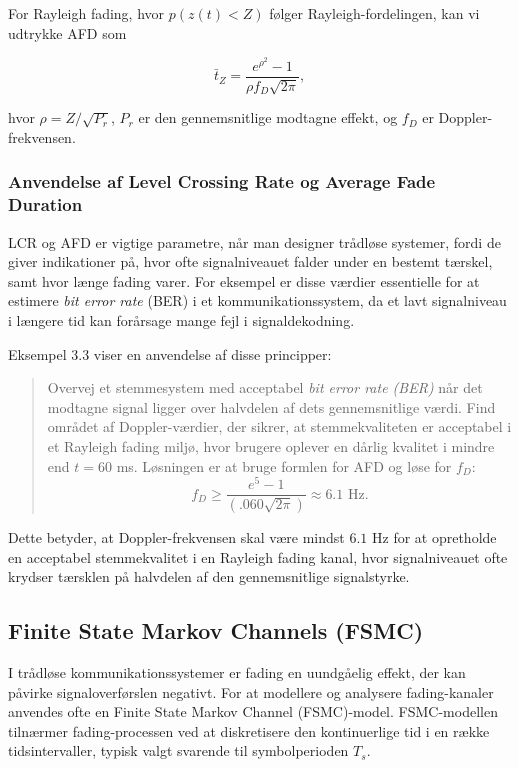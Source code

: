 \documentclass[a4paper,12pt]{book}
\begin{document}
	For Rayleigh fading, hvor $p(z(t) < Z)$ følger Rayleigh-fordelingen, kan vi udtrykke AFD som
	
	\[
	\bar{t}_Z = \frac{e^{\rho^2} - 1}{\rho f_D \sqrt{2\pi}},
	\]
	
	hvor $\rho = Z/\sqrt{P_r}$, $P_r$ er den gennemsnitlige modtagne effekt, og $f_D$ er Doppler-frekvensen.
	
	\subsubsection{Anvendelse af Level Crossing Rate og Average Fade Duration}
	LCR og AFD er vigtige parametre, når man designer trådløse systemer, fordi de giver indikationer på, hvor ofte signalniveauet falder under en bestemt tærskel, samt hvor længe fading varer. For eksempel er disse værdier essentielle for at estimere \textit{bit error rate} (BER) i et kommunikationssystem, da et lavt signalniveau i længere tid kan forårsage mange fejl i signaldekodning.
	
	Eksempel 3.3 viser en anvendelse af disse principper:
	\begin{quote}
		Overvej et stemmesystem med acceptabel \textit{bit error rate (BER)} når det modtagne signal ligger over halvdelen af dets gennemsnitlige værdi. Find området af Doppler-værdier, der sikrer, at stemmekvaliteten er acceptabel i et Rayleigh fading miljø, hvor brugere oplever en dårlig kvalitet i mindre end $t = 60$ ms. Løsningen er at bruge formlen for AFD og løse for $f_D$:
		\[
		f_D \geq \frac{e^{5} - 1}{(.060\sqrt{2\pi})} \approx 6.1 \text{ Hz}.
		\]
	\end{quote}
	
	Dette betyder, at Doppler-frekvensen skal være mindst $6.1$ Hz for at opretholde en acceptabel stemmekvalitet i en Rayleigh fading kanal, hvor signalniveauet ofte krydser tærsklen på halvdelen af den gennemsnitlige signalstyrke.
	
	
	\subsection{Finite State Markov Channels (FSMC)}
	\label{sec:fsmc}
	
	I trådløse kommunikationssystemer er fading en uundgåelig effekt, der kan påvirke signaloverførslen negativt. For at modellere og analysere fading-kanaler anvendes ofte en Finite State Markov Channel (FSMC)-model. FSMC-modellen tilnærmer fading-processen ved at diskretisere den kontinuerlige tid i en række tidsintervaller, typisk valgt svarende til symbolperioden \(T_s\).
	
\end{document}
